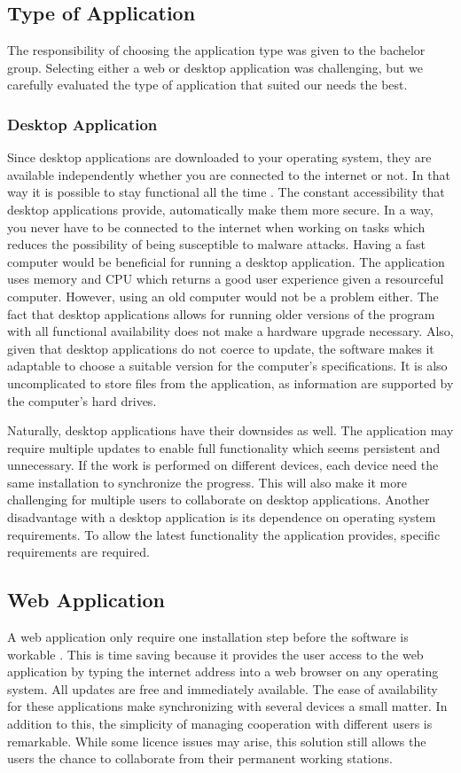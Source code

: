 \subsection{Type of Application}
The responsibility of choosing the application type was given to the bachelor group. Selecting either a web or desktop application was challenging, but we carefully evaluated the type of application that suited our needs the best. 

\subsubsection*{Desktop Application}
Since desktop applications are downloaded to your operating system, they are available independently whether you are connected to the internet or not. In that way it is possible to stay functional all the time \cite{WebVsDesktop}. The constant accessibility that desktop applications provide, automatically make them more secure. In a way, you never have to be connected to the internet when working on tasks which reduces the possibility of being susceptible to malware attacks. Having a fast computer would be beneficial for running a desktop application. The application uses memory and CPU which returns a good user experience given a resourceful computer. However, using an old computer would not be a problem either. The fact that desktop applications allows for running older versions of the program with all functional availability does not make a hardware upgrade necessary. Also, given that desktop applications do not coerce to update, the software makes it adaptable to choose a suitable version for the computer's specifications. It is also uncomplicated to store files from the application, as information are supported by the computer's hard drives. 

Naturally, desktop applications have their downsides as well. The application may require multiple updates to enable full functionality which seems persistent and unnecessary. If the work is performed on different devices, each device need the same installation to synchronize the progress. This will also make it more challenging for multiple users to collaborate on desktop applications. Another disadvantage with a desktop application is its dependence on operating system requirements. To allow the latest functionality the application provides, specific requirements are required. 

\subsection*{Web Application}
A web application only require one installation step before the software is workable \cite{WebVsDesktop}. This is time saving because it provides the user access to the web application by typing the internet address into a web browser on any operating system. All updates are free and immediately available. The ease of availability for these applications make synchronizing with several devices a small matter. In addition to this, the simplicity of managing cooperation with different users is remarkable. While some licence issues may arise, this solution still allows the users the chance to collaborate from their permanent working stations.

